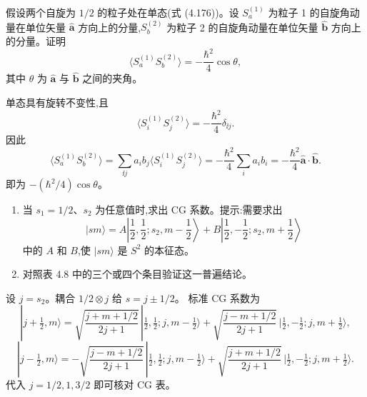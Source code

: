 \begin{question}
假设两个自旋为 $1/2$ 的粒子处在单态(式 (4.176))。设 $S_a^{(1)}$ 为粒子 1 的自旋角动量在单位矢量 $\hat{\mathbf a}$ 方向上的分量,$S_b^{(2)}$ 为粒子 2 的自旋角动量在单位矢量 $\hat{\mathbf b}$ 方向上的分量。证明
\[
\bigl\langle S_a^{(1)}S_b^{(2)}\bigr\rangle=-\frac{\hbar^2}{4}\cos\theta,
\]
其中 $\theta$ 为 $\hat{\mathbf a}$ 与 $\hat{\mathbf b}$ 之间的夹角。

\par\smallskip
{}

\end{question}
\begin{solution}

单态具有旋转不变性,且
\[
\langle S_i^{(1)}S_j^{(2)}\rangle=-\frac{\hbar^2}{4}\delta_{\ii j}.
\]
因此
\[
\langle S_a^{(1)}S_b^{(2)}\rangle
=\sum_{\ii j}a_i b_j\langle S_i^{(1)}S_j^{(2)}\rangle
=-\frac{\hbar^2}{4}\sum_i a_i b_i
=-\frac{\hbar^2}{4}\hat{\mathbf a}\cdot\hat{\mathbf b}.
\]
即为 $-(\hbar^2/4)\cos\theta$。

\end{solution}

\begin{question}
\begin{enumerate}
\item 当 $s_1=1/2$、$s_2$ 为任意值时,求出 CG 系数。提示:需要求出
\[
|sm\rangle=A\left|\frac12,\frac12;s_2,m-\frac12\right\rangle+B\left|\frac12,-\frac12;s_2,m+\frac12\right\rangle
\]
中的 $A$ 和 $B$,使 $|sm\rangle$ 是 $S^2$ 的本征态。
\item 对照表 4.8 中的三个或四个条目验证这一普遍结论。
\end{enumerate}
\end{question}
\begin{solution}

设 $j=s_2$。耦合 $1/2\otimes j$ 给 $s=j\pm1/2$。
标准 CG 系数为
\[
|j+\tfrac12,m\rangle=
\sqrt{\frac{j+m+1/2}{2j+1}}\,|\tfrac12,\tfrac12;j,m-\tfrac12\rangle
+\sqrt{\frac{j-m+1/2}{2j+1}}\,|\tfrac12,-\tfrac12;j,m+\tfrac12\rangle,
\]
\[
|j-\tfrac12,m\rangle=
-\sqrt{\frac{j-m+1/2}{2j+1}}\,|\tfrac12,\tfrac12;j,m-\tfrac12\rangle
+\sqrt{\frac{j+m+1/2}{2j+1}}\,|\tfrac12,-\tfrac12;j,m+\tfrac12\rangle.
\]
代入 $j=1/2,1,3/2$ 即可核对 CG 表。

\end{solution}

